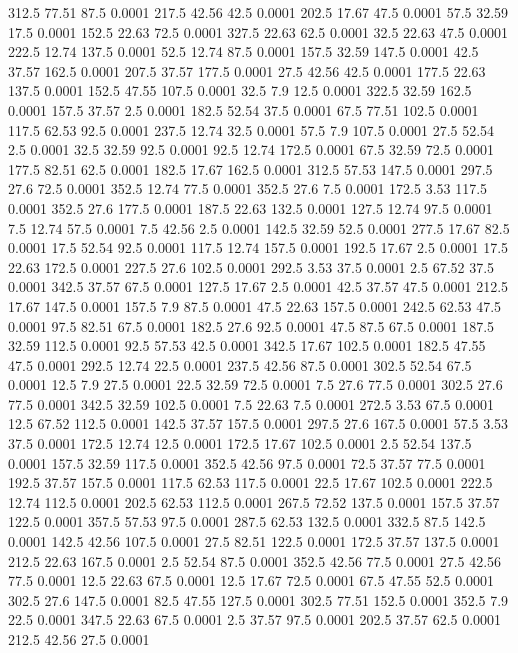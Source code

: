 312.5	77.51	87.5	0.0001
217.5	42.56	42.5	0.0001
202.5	17.67	47.5	0.0001
57.5	32.59	17.5	0.0001
152.5	22.63	72.5	0.0001
327.5	22.63	62.5	0.0001
32.5	22.63	47.5	0.0001
222.5	12.74	137.5	0.0001
52.5	12.74	87.5	0.0001
157.5	32.59	147.5	0.0001
42.5	37.57	162.5	0.0001
207.5	37.57	177.5	0.0001
27.5	42.56	42.5	0.0001
177.5	22.63	137.5	0.0001
152.5	47.55	107.5	0.0001
32.5	7.9	12.5	0.0001
322.5	32.59	162.5	0.0001
157.5	37.57	2.5	0.0001
182.5	52.54	37.5	0.0001
67.5	77.51	102.5	0.0001
117.5	62.53	92.5	0.0001
237.5	12.74	32.5	0.0001
57.5	7.9	107.5	0.0001
27.5	52.54	2.5	0.0001
32.5	32.59	92.5	0.0001
92.5	12.74	172.5	0.0001
67.5	32.59	72.5	0.0001
177.5	82.51	62.5	0.0001
182.5	17.67	162.5	0.0001
312.5	57.53	147.5	0.0001
297.5	27.6	72.5	0.0001
352.5	12.74	77.5	0.0001
352.5	27.6	7.5	0.0001
172.5	3.53	117.5	0.0001
352.5	27.6	177.5	0.0001
187.5	22.63	132.5	0.0001
127.5	12.74	97.5	0.0001
7.5	12.74	57.5	0.0001
7.5	42.56	2.5	0.0001
142.5	32.59	52.5	0.0001
277.5	17.67	82.5	0.0001
17.5	52.54	92.5	0.0001
117.5	12.74	157.5	0.0001
192.5	17.67	2.5	0.0001
17.5	22.63	172.5	0.0001
227.5	27.6	102.5	0.0001
292.5	3.53	37.5	0.0001
2.5	67.52	37.5	0.0001
342.5	37.57	67.5	0.0001
127.5	17.67	2.5	0.0001
42.5	37.57	47.5	0.0001
212.5	17.67	147.5	0.0001
157.5	7.9	87.5	0.0001
47.5	22.63	157.5	0.0001
242.5	62.53	47.5	0.0001
97.5	82.51	67.5	0.0001
182.5	27.6	92.5	0.0001
47.5	87.5	67.5	0.0001
187.5	32.59	112.5	0.0001
92.5	57.53	42.5	0.0001
342.5	17.67	102.5	0.0001
182.5	47.55	47.5	0.0001
292.5	12.74	22.5	0.0001
237.5	42.56	87.5	0.0001
302.5	52.54	67.5	0.0001
12.5	7.9	27.5	0.0001
22.5	32.59	72.5	0.0001
7.5	27.6	77.5	0.0001
302.5	27.6	77.5	0.0001
342.5	32.59	102.5	0.0001
7.5	22.63	7.5	0.0001
272.5	3.53	67.5	0.0001
12.5	67.52	112.5	0.0001
142.5	37.57	157.5	0.0001
297.5	27.6	167.5	0.0001
57.5	3.53	37.5	0.0001
172.5	12.74	12.5	0.0001
172.5	17.67	102.5	0.0001
2.5	52.54	137.5	0.0001
157.5	32.59	117.5	0.0001
352.5	42.56	97.5	0.0001
72.5	37.57	77.5	0.0001
192.5	37.57	157.5	0.0001
117.5	62.53	117.5	0.0001
22.5	17.67	102.5	0.0001
222.5	12.74	112.5	0.0001
202.5	62.53	112.5	0.0001
267.5	72.52	137.5	0.0001
157.5	37.57	122.5	0.0001
357.5	57.53	97.5	0.0001
287.5	62.53	132.5	0.0001
332.5	87.5	142.5	0.0001
142.5	42.56	107.5	0.0001
27.5	82.51	122.5	0.0001
172.5	37.57	137.5	0.0001
212.5	22.63	167.5	0.0001
2.5	52.54	87.5	0.0001
352.5	42.56	77.5	0.0001
27.5	42.56	77.5	0.0001
12.5	22.63	67.5	0.0001
12.5	17.67	72.5	0.0001
67.5	47.55	52.5	0.0001
302.5	27.6	147.5	0.0001
82.5	47.55	127.5	0.0001
302.5	77.51	152.5	0.0001
352.5	7.9	22.5	0.0001
347.5	22.63	67.5	0.0001
2.5	37.57	97.5	0.0001
202.5	37.57	62.5	0.0001
212.5	42.56	27.5	0.0001
